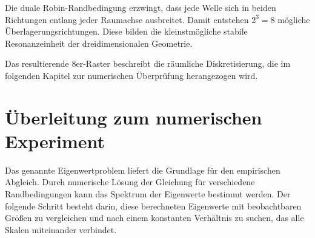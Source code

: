 Die duale Robin-Randbedingung erzwingt,
dass jede Welle sich in beiden Richtungen
entlang jeder Raumachse ausbreitet.
Damit entstehen \(2^3 = 8\)
mögliche Überlagerungsrichtungen.
Diese bilden die kleinstmögliche stabile
Resonanzeinheit der dreidimensionalen Geometrie.

Das resultierende 8er-Raster
beschreibt die räumliche Diskretisierung,
die im folgenden Kapitel
zur numerischen Überprüfung herangezogen wird.

\section{Überleitung zum numerischen Experiment}

Das genannte Eigenwertproblem liefert die Grundlage für den empirischen Abgleich.
Durch numerische Lösung der Gleichung für verschiedene Randbedingungen
kann das Spektrum der Eigenwerte bestimmt werden.
Der folgende Schritt besteht darin,
diese berechneten Eigenwerte mit beobachtbaren Größen zu vergleichen
und nach einem konstanten Verhältnis zu suchen,
das alle Skalen miteinander verbindet.

